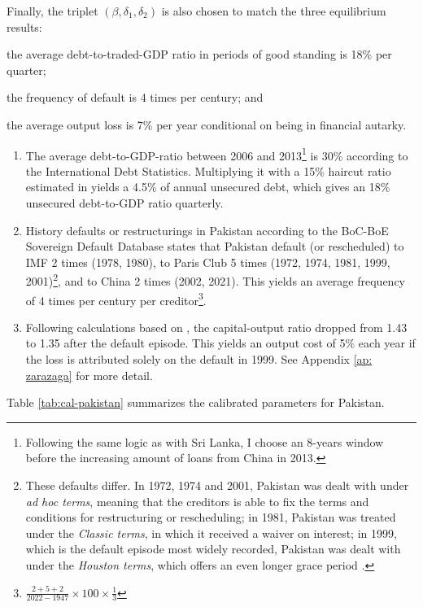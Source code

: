 Finally, the triplet $\left( \beta, \delta_1, \delta_2 \right)$ is also chosen to match the three equilibrium results:
\begin{enumerate*}[label = (\roman*)]
    \item the average debt-to-traded-GDP ratio in periods of good standing is 18\% per quarter;
    \item the frequency of default is 4 times per century; and
    \item the average output loss is 7\% per year conditional on being in financial autarky.
\end{enumerate*}
\begin{enumerate}[label = (\roman*)]
    \item
    The average debt-to-GDP-ratio between 2006 and 2013\footnote{
    Following the same logic as with Sri Lanka, I choose an 8-years window before the increasing amount of loans from China in 2013.}
    is 30\% according to the International Debt Statistics. Multiplying it with a 15\% haircut ratio estimated in \citet{Cruces-Trebesch-13} yields a 4.5\% of annual unsecured debt, which gives an 18\% unsecured debt-to-GDP ratio quarterly.
    \item History defaults or restructurings in Pakistan according to the BoC-BoE Sovereign Default Database states that Pakistan default (or rescheduled) to IMF 2 times (1978, 1980), to Paris Club 5 times (1972, 1974, 1981, 1999, 2001)\footnote{
        These defaults differ. In 1972, 1974 and 2001, Pakistan was dealt with under \emph{ad hoc terms}, meaning that the creditors is able to fix the terms and conditions for restructuring or rescheduling; in 1981, Pakistan was treated under the \emph{Classic terms}, in which it received a waiver on interest; in 1999, which is the default episode most widely recorded, Pakistan was dealt with under the \emph{Houston terms}, which offers an even longer grace period \citep{pakistan-default-start}.
    }, and to China 2 times (2002, 2021). This yields an average frequency of 4 times per century per creditor\footnote{$\frac{2+5+2}{2022 - 1947}\times 100 \times \frac{1}{3}$}.
    \item
    Following calculations based on \citet*{zarazaga-12}, the capital-output ratio dropped from 1.43 to 1.35 after the default episode. This yields an output cost of 5\% each year if the loss is attributed solely on the default in 1999. See Appendix \ref{ap: zarazaga} for more detail.
\end{enumerate}
Table \ref{tab:cal-pakistan} summarizes the calibrated parameters for Pakistan.

